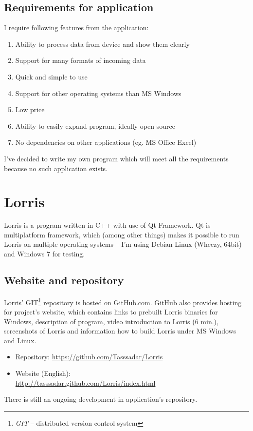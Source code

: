 \documentclass[12pt, a4paper, oneside]{article}
\newcommand{\It}{\textit}  %
\begin{document}
\subsection{Requirements for application}
\label{reqs}
I require following features from the application:
\begin{enumerate}
    \item Ability to process data from device and show them clearly %
    \item Support for many formats of incoming data%
    \item Quick and simple to use%
    \item Support for other operating systems than MS Windows %
    \item Low price%
    \item Ability to easily expand program, ideally open-source %
    \item No dependencies on other applications (eg. MS Office Excel) %
\end{enumerate}

I've decided to write my own program which will meet all the requirements because no such application exists.

\section{Lorris}
Lorris is a program written in C++ with use of Qt Framework. Qt is multiplatform framework, which (among other things) makes it possible to run Lorris on multiple operating systems -- I'm using Debian Linux (Wheezy, 64bit) and Windows 7 for testing.

\subsection{Website and repository}
Lorris' GIT\footnote{\It{GIT} -- distributed version control system} repository is hosted on GitHub.com. GitHub also provides hosting for project's website, which contains links to prebuilt Lorris binaries for Windows, description of program, video introduction to Lorris (6 min.), screenshots of Lorris and information how to build Lorris under MS Windows and Linux.
\begin{itemize}
    \item Repository: \url{https://github.com/Tasssadar/Lorris}
    \item Website (English):\\ \url{http://tasssadar.github.com/Lorris/index.html}
\end{itemize}
There is still an ongoing development in application's repository.
\end{document}
